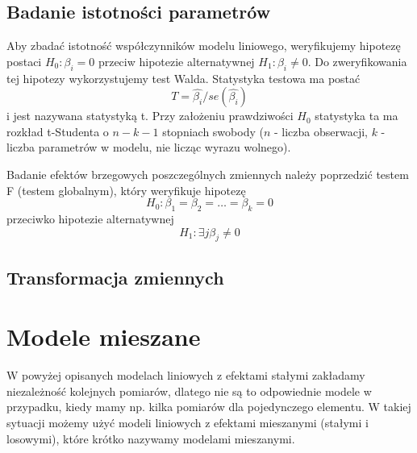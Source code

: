 \documentclass[12pt]{mwbk}
\theoremstyle{plain}
\theoremstyle{definition}
\theoremstyle{remark}
\begin{document}
\subsection{Badanie istotności parametrów}

Aby zbadać istotność współczynników modelu liniowego, weryfikujemy hipotezę postaci $H_0: \beta_i = 0$ przeciw hipotezie alternatywnej $H_1: \beta_i \neq 0.																																																																																																																																																																																																																																																																																																																																																																																																																																																																																																																													$ Do zweryfikowania tej hipotezy wykorzystujemy test Walda. Statystyka testowa ma postać $$T=\hat{\beta_i}/se(\hat{\beta_i})$$ i jest nazywana statystyką t. Przy założeniu prawdziwości $H_0$ statystyka ta ma rozkład t-Studenta o $n-k-1$ stopniach swobody ($n$ - liczba obserwacji, $k$ - liczba parametrów w modelu, nie licząc wyrazu wolnego).

Badanie efektów brzegowych poszczególnych zmiennych należy poprzedzić testem F (testem globalnym), który weryfikuje hipotezę $$H_0: \beta_1=\beta_2=\ldots=\beta_k=0$$
 przeciwko hipotezie alternatywnej $$H_1: \exists{j} \beta_j \neq 0 $$

\subsection{Transformacja zmiennych}


\section{Modele mieszane} 
W powyżej opisanych modelach liniowych z efektami stałymi zakładamy niezależność kolejnych pomiarów, dlatego nie są to odpowiednie modele w przypadku, kiedy mamy np. kilka pomiarów dla pojedynczego elementu. W takiej sytuacji możemy użyć modeli liniowych z efektami mieszanymi (stałymi i losowymi), które krótko nazywamy modelami mieszanymi.
\end{document}
